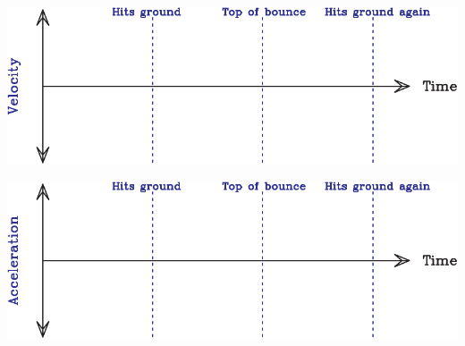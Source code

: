 \documentclass[12pt]{article}
\begin{document}
\begin{enumerate}
\begin{minipage}{0.5\textwidth}
\begin{center}
	\includegraphics[width=\textwidth]{velocity-crop.pdf}
	
	\vspace{0.4in}
	
	\includegraphics[width=\textwidth]{acceleration-crop.pdf}
\end{center}

\end{minipage}







\newpage



\end{enumerate}
\end{document}

